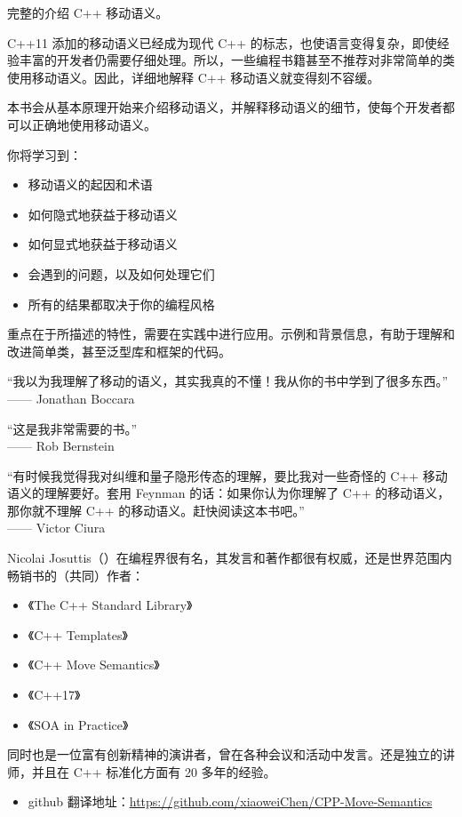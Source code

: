 
完整的介绍 C++ 移动语义。

C++11 添加的移动语义已经成为现代 C++ 的标志，也使语言变得复杂，即使经验丰富的开发者仍需要仔细处理。所以，一些编程书籍甚至不推荐对非常简单的类使用移动语义。因此，详细地解释 C++ 移动语义就变得刻不容缓。

本书会从基本原理开始来介绍移动语义，并解释移动语义的细节，使每个开发者都可以正确地使用移动语义。

你将学习到：
\begin{itemize}
  \item 移动语义的起因和术语
  \item 如何隐式地获益于移动语义
  \item 如何显式地获益于移动语义
  \item 会遇到的问题，以及如何处理它们
  \item 所有的结果都取决于你的编程风格
\end{itemize}

重点在于所描述的特性，需要在实践中进行应用。示例和背景信息，有助于理解和改进简单类，甚至泛型库和框架的代码。

\begin{myQuote}
“我以为我理解了移动的语义，其实我真的不懂！我从你的书中学到了很多东西。”\\
\hfill —— Jonathan Boccara
\end{myQuote}

\begin{myQuote}
“这是我非常需要的书。”\\
\hfill —— Rob Bernstein
\end{myQuote}

\begin{myQuote}
“有时候我觉得我对纠缠和量子隐形传态的理解，要比我对一些奇怪的 C++ 移动语义的理解要好。套用 Feynman 的话：如果你认为你理解了 C++ 的移动语义，那你就不理解 C++ 的移动语义。赶快阅读这本书吧。”\\
\hfill —— Victor Ciura
\end{myQuote}


Nicolai Josuttis（）在编程界很有名，其发言和著作都很有权威，还是世界范围内畅销书的（共同）作者：
\begin{itemize}
  \item 《The C++ Standard Library》
  \item 《C++ Templates》
  \item 《C++ Move Semantics》
  \item 《C++17》
  \item 《SOA in Practice》
\end{itemize}

同时也是一位富有创新精神的演讲者，曾在各种会议和活动中发言。还是独立的讲师，并且在 C++ 标准化方面有 20 多年的经验。


\begin{itemize}
  \item github 翻译地址：\href{https://github.com/xiaoweiChen/CPP-Move-Semantics}{https://github.com/xiaoweiChen/CPP-Move-Semantics}
\end{itemize}
